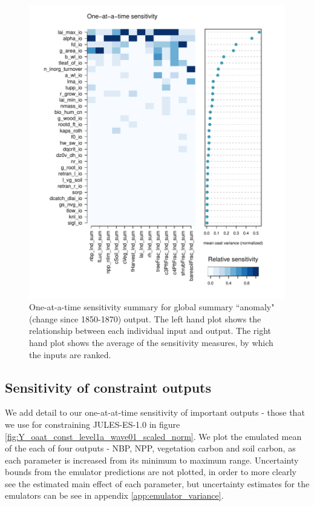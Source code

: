 \documentclass[gmd, manuscript]{copernicus}
\begin{document}
\begin{figure}[t]
\includegraphics[width=12cm]{./figs/fig10.pdf}
\caption{One-at-a-time sensitivity summary for global summary ``anomaly" (change since 1850-1870) output. The left hand plot shows the relationship between each individual input and output. The right hand plot shows the average of the sensitivity measures, by which the inputs are ranked.}
\label{fig:oat_var_sensmat_level1a_wave01_Anom}
\end{figure}

\subsection{Sensitivity of constraint outputs}\label{ssec:sa_constraint_outputs}

We add detail to our one-at-at-time sensitivity of important outputs - those that we use for constraining JULES-ES-1.0 in figure \ref{fig:Y_oaat_const_level1a_wave01_scaled_norm}. We plot the emulated mean of the each of four outputs - NBP, NPP, vegetation carbon and soil carbon, as each parameter is increased from its minimum to maximum range. Uncertainty bounds from the emulator predictions are not plotted, in order to more clearly see the estimated main effect of each parameter, but uncertainty estimates for the emulators can be see in appendix \ref{app:emulator_variance}.
\end{document}
